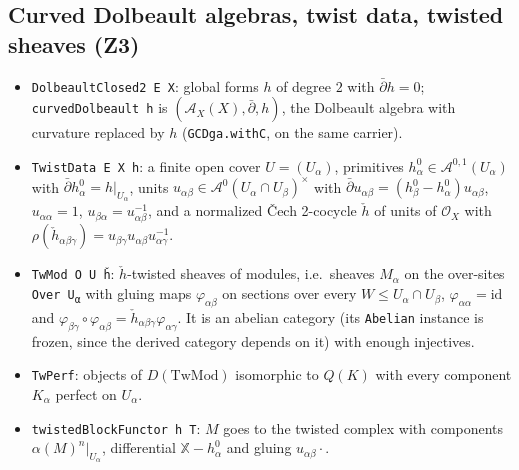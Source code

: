 \subsection{Curved Dolbeault algebras, twist data, twisted sheaves (Z3)}\label{sec:tw-defs}
\begin{itemize}
\item \texttt{DolbeaultClosed2 E X}: global forms $h$ of degree $2$ with ${\bar\partial} h=0$;
\texttt{curvedDolbeault h} is $({\mathcal{A}}_X(X),{\bar\partial},h)$, the Dolbeault algebra with curvature replaced
by $h$ (\texttt{GCDga.withC}, on the same carrier).
\item \texttt{TwistData E X h}: a finite open cover $U=(U_\alpha)$, primitives
$h^0_\alpha\in{\mathcal{A}}^{0,1}(U_\alpha)$ with ${\bar\partial} h^0_\alpha=h|_{U_\alpha}$, units
$u_{\alpha\beta}\in{\mathcal{A}}^0(U_\alpha\cap U_\beta)^\times$ with
${\bar\partial} u_{\alpha\beta}=(h^0_\beta-h^0_\alpha)u_{\alpha\beta}$, $u_{\alpha\alpha}=1$,
$u_{\beta\alpha}=u_{\alpha\beta}^{-1}$, and a normalized Čech 2-cocycle ${\check h}$ of units of
${\mathcal{O}}_X$ with $\rho({\check h}_{\alpha\beta\gamma})=u_{\beta\gamma}u_{\alpha\beta}u_{\alpha\gamma}^{-1}$.
\item \texttt{TwMod O U ȟ}: ${\check h}$-twisted sheaves of modules, i.e.\ sheaves $M_\alpha$ on the
over-sites \texttt{Over U\textsubscript{α}} with gluing maps $\varphi_{\alpha\beta}$ on sections over every
$W\le U_\alpha\cap U_\beta$, $\varphi_{\alpha\alpha}=\mathrm{id}$ and
$\varphi_{\beta\gamma}\circ\varphi_{\alpha\beta}={\check h}_{\alpha\beta\gamma}\varphi_{\alpha\gamma}$. It is an
abelian category (its \texttt{Abelian} instance is frozen, since the derived category depends on it)
with enough injectives.
\item \texttt{TwPerf}: objects of $D(\mathrm{TwMod})$ isomorphic to $Q(K)$ with every component
$K_\alpha$ perfect on $U_\alpha$.
\item \texttt{twistedBlockFunctor h T}: $M$ goes to the twisted complex with components
$\alpha(M)^n|_{U_\alpha}$, differential ${\mathbb{X}}-h^0_\alpha$ and gluing $u_{\alpha\beta}\cdot$.
\end{itemize}

